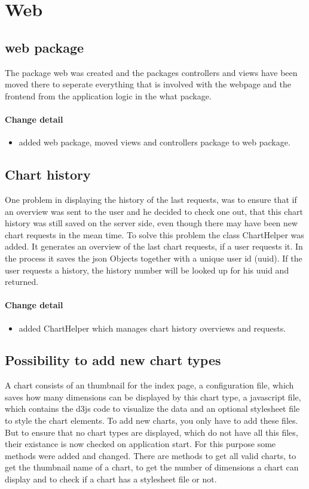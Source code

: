 \section{Web}
\subsection{web package}
The package web was created and the packages controllers and views have been moved there 
to seperate everything that is involved with the webpage and the frontend from the application logic in the what package.

\paragraph{Change detail}
\begin{itemize}
  \item added web package, moved views and controllers package to web package.
\end{itemize}

\subsection{Chart history}
One problem in displaying the history of the last requests, was to ensure that if an overview was sent to the user and he decided to check one out,
 that this chart history was still saved on the server side, even though there may have been new chart requests in the mean time.
To solve this problem the class ChartHelper was added. It generates an overview of the last chart requests, 
if a user requests it. In the process it saves the json Objects together with a unique user id (uuid). 
If the user requests a history, the history number will be looked up for his uuid and returned.

\paragraph{Change detail}
\begin{itemize}
  \item added ChartHelper which manages chart history overviews and requests.
\end{itemize}

\subsection{Possibility to add new chart types}
A chart consists of an thumbnail for the index page, a configuration file, which saves how many dimensions can be displayed by this chart type,
a javascript file, which contains the d3js code to visualize the data and an optional stylesheet file to style the chart elements.
To add new charts, you only have to add these files.
But to ensure that no chart types are displayed, which do not have all this files, their existance is now checked on application start.
For this purpose some methods were added and changed. There are methods to get all valid charts, to get the thumbnail name of a chart,
to get the number of dimensions a chart can display and to check if a chart has a stylesheet file or not.


